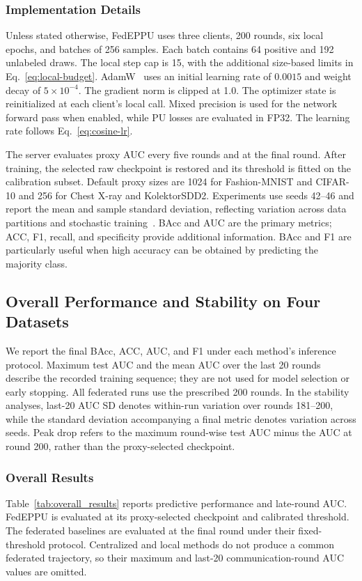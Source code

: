 \documentclass[lettersize,journal]{IEEEtran}
\begin{document}
\subsubsection{Implementation Details}
Unless stated otherwise, FedEPPU uses three clients, 200 rounds, six local epochs, and batches of 256 samples. Each batch contains 64 positive and 192 unlabeled draws. The local step cap is 15, with the additional size-based limits in Eq.~\eqref{eq:local-budget}. AdamW~\cite{ref_adamw} uses an initial learning rate of $0.0015$ and weight decay of $5\times10^{-4}$. The gradient norm is clipped at 1.0. The optimizer state is reinitialized at each client's local call. Mixed precision is used for the network forward pass when enabled, while PU losses are evaluated in FP32. The learning rate follows Eq.~\eqref{eq:cosine-lr}.

The server evaluates proxy AUC every five rounds and at the final round. After training, the selected raw checkpoint is restored and its threshold is fitted on the calibration subset. Default proxy sizes are 1024 for Fashion-MNIST and CIFAR-10 and 256 for Chest X-ray and KolektorSDD2. Experiments use seeds 42--46 and report the mean and sample standard deviation, reflecting variation across data partitions and stochastic training~\cite{ref_benchmark_variance}. BAcc and AUC are the primary metrics; ACC, F1, recall, and specificity provide additional information. BAcc and F1 are particularly useful when high accuracy can be obtained by predicting the majority class.


\subsection{Overall Performance and Stability on Four Datasets}

We report the final BAcc, ACC, AUC, and F1 under each method's inference protocol. Maximum test AUC and the mean AUC over the last 20 rounds describe the recorded training sequence; they are not used for model selection or early stopping. All federated runs use the prescribed 200 rounds. In the stability analyses, last-20 AUC SD denotes within-run variation over rounds 181--200, while the standard deviation accompanying a final metric denotes variation across seeds. Peak drop refers to the maximum round-wise test AUC minus the AUC at round 200, rather than the proxy-selected checkpoint.

\subsubsection{Overall Results}
Table~\ref{tab:overall_results} reports predictive performance and late-round AUC. FedEPPU is evaluated at its proxy-selected checkpoint and calibrated threshold. The federated baselines are evaluated at the final round under their fixed-threshold protocol. Centralized and local methods do not produce a common federated trajectory, so their maximum and last-20 communication-round AUC values are omitted.
\end{document}
